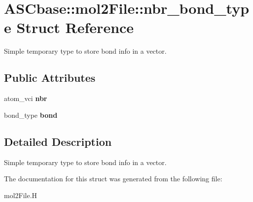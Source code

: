 \section{ASCbase::mol2File::nbr\_\-bond\_\-type Struct Reference}
\label{structASCbase_1_1mol2File_1_1nbr__bond__type}
Simple temporary type to store bond info in a vector.  


\subsection*{Public Attributes}
\begin{CompactItemize}
\item 
atom\_\-vci \textbf{nbr}\label{structASCbase_1_1mol2File_1_1nbr__bond__type_a83f213d22c3c323abc1c4e0ea6dcd7c}

\item 
bond\_\-type \textbf{bond}\label{structASCbase_1_1mol2File_1_1nbr__bond__type_4ddb744e4eed89b40973c55f398addf1}

\end{CompactItemize}


\subsection{Detailed Description}
Simple temporary type to store bond info in a vector. 



The documentation for this struct was generated from the following file:\begin{CompactItemize}
\item 
mol2File.H\end{CompactItemize}
